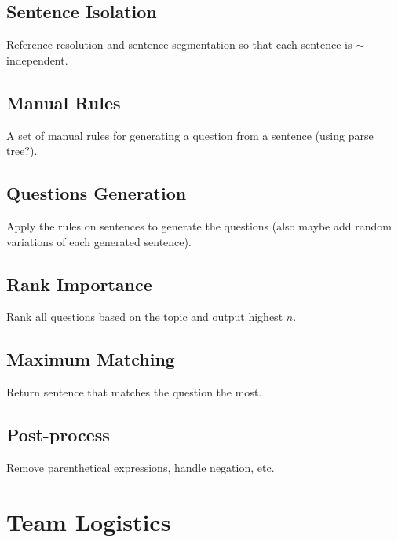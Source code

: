\documentclass{article}
\begin{document}
    \subsection{Sentence Isolation}
    Reference resolution and sentence segmentation so that each sentence is $\sim$independent.
    \subsection{Manual Rules}
    A set of manual rules for generating a question from a sentence (using parse tree?).
    \subsection{Questions Generation}
    Apply the rules on sentences to generate the questions (also maybe add random variations of each
    generated sentence).
    \subsection{Rank Importance}
    Rank all questions based on the topic and output highest $n$.
    \subsection{Maximum Matching}
    Return sentence that matches the question  the most.
    \subsection{Post-process}
    Remove parenthetical expressions, handle negation, etc.
    \section{Team Logistics}
    
\end{document}
